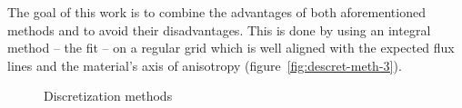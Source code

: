 The goal of this work is to combine the advantages of both
aforementioned methods and to avoid their disadvantages.  This is done
by using an integral method -- the \gls{fit} -- on a regular grid which is
well aligned with the expected flux lines and the material's axis of
anisotropy (figure~\ref{fig:descret-meth-3}).
\begin{figure}
  \centering
  \newline \vfil
  \newline \vfil
  \caption{Discretization methods}
  \label{fig:descret-meth}
\end{figure}

